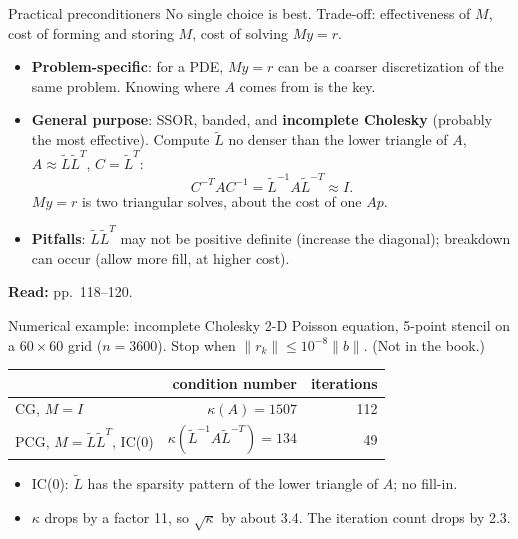 \documentclass[12pt,aspectratio=169]{beamer}
\newcommand{\readpp}[1]{{\color{red!80!black}\textbf{Read:} #1}}
\begin{document}
\begin{frame}{Practical preconditioners}
  No single choice is best. Trade-off: effectiveness of $M$, cost of forming and storing $M$, cost of solving $My=r$.
  \begin{itemize}
    \item \textbf{Problem-specific}: for a PDE, $My=r$ can be a coarser discretization of the same problem.
      Knowing where $A$ comes from is the key.
    \item \textbf{General purpose}: SSOR, banded, and \textbf{incomplete Cholesky} (probably the most effective).
      Compute $\tilde L$ no denser than the lower triangle of $A$, $A\approx\tilde L\tilde L^T$, $C=\tilde L^T$:
      \[
        C^{-T}AC^{-1} = \tilde L^{-1}A\tilde L^{-T}\approx I.
      \]
      $My=r$ is two triangular solves, about the cost of one $Ap$.
    \item \textbf{Pitfalls}: $\tilde L\tilde L^T$ may not be positive definite (increase the diagonal);
      breakdown can occur (allow more fill, at higher cost).
  \end{itemize}
  \readpp{pp.~118--120.}
\end{frame}

\begin{frame}{Numerical example: incomplete Cholesky}
  2-D Poisson equation, 5-point stencil on a $60\times60$ grid ($n=3600$).
  Stop when $\|r_k\|\le10^{-8}\|b\|$. (Not in the book.)

  \vspace{1ex}
  \centering
  \renewcommand{\arraystretch}{1.1}
  \begin{tabular}{lrr}
    \toprule
    & condition number & iterations\\
    \midrule
    CG, $M=I$ & $\kappa(A)=1507$ & 112\\
    PCG, $M=\tilde L\tilde L^T$, IC(0) & $\kappa(\tilde L^{-1}A\tilde L^{-T})=134$ & 49\\
    \bottomrule
  \end{tabular}

  \raggedright
  \vspace{1ex}
  \begin{itemize}
    \item IC(0): $\tilde L$ has the sparsity pattern of the lower triangle of $A$; no fill-in.
    \item $\kappa$ drops by a factor 11, so $\sqrt\kappa$ by about 3.4. The iteration count drops by 2.3.
  \end{itemize}
\end{frame}
\end{document}
